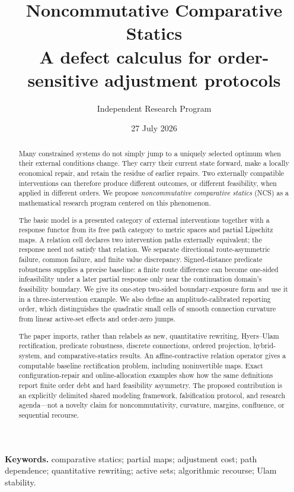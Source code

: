 \documentclass[11pt]{article}
\title{\vspace{-1.5em}
{\color{NCSBlue}\bfseries Noncommutative Comparative Statics}\\[0.35em]
\large A defect calculus for order-sensitive adjustment protocols}
\author{Independent Research Program}
\date{27 July 2026}
\theoremstyle{definition}
\theoremstyle{remark}
\begin{document}
\maketitle

\begin{abstract}
Many constrained systems do not simply jump to a uniquely selected optimum
when their external conditions change. They carry their current state
forward, make a locally economical repair, and retain the residue of earlier
repairs. Two externally compatible interventions can therefore produce
different outcomes, or different feasibility, when applied in different
orders. We propose \emph{noncommutative comparative statics} (NCS) as a
mathematical research program centered on this phenomenon.

The basic model is a presented category of external interventions together
with a response functor from its free path category to metric spaces and
partial Lipschitz maps. A relation cell declares two intervention paths
externally equivalent; the response need not satisfy that relation. We
separate directional route-asymmetric failure, common failure, and finite
value discrepancy. Signed-distance predicate robustness supplies a precise
baseline: a finite route difference can become one-sided infeasibility under
a later partial response only near the continuation domain's feasibility
boundary. We give its one-step two-sided boundary-exposure form and use it in
a three-intervention example. We also define an amplitude-calibrated reporting
order, which distinguishes the quadratic small cells of smooth connection
curvature from linear active-set effects and order-zero jumps.

The paper imports, rather than relabels as new, quantitative rewriting,
Hyers--Ulam rectification, predicate robustness, discrete connections, ordered
projection, hybrid-system, and comparative-statics results. An
affine-contractive relation operator gives a computable baseline
rectification problem, including noninvertible maps. Exact
configuration-repair and online-allocation examples show how the same
definitions report finite order debt and hard feasibility asymmetry. The
proposed contribution is an explicitly delimited shared modeling framework,
falsification protocol, and research agenda---not a novelty claim for
noncommutativity, curvature, margins, confluence, or sequential recourse.
\end{abstract}

\noindent\textbf{Keywords.}
comparative statics; partial maps; adjustment cost; path dependence;
quantitative rewriting; active sets; algorithmic recourse; Ulam stability.
\end{document}
